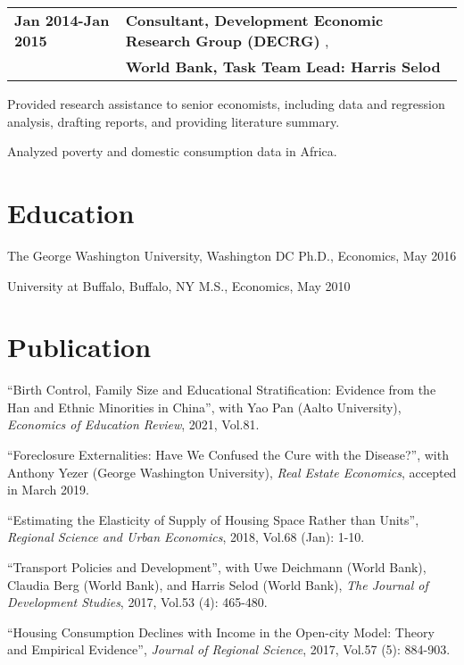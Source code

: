 \documentclass[letterpaper]{article}
\renewenvironment{itemize}{
  \begin{list}{}{
    \setlength{\leftmargin}{1.5em}
  }
}{
  \end{list}
}
\begin{document}
\begin{tabular}{ll}   

 {\bfseries Jan 2014-Jan 2015} & {\bfseries Consultant, Development Economic Research Group (DECRG)} , \\
                   & {\bfseries World Bank, Task Team Lead: Harris Selod} \\                      
 \end{tabular}  
\begin{itemize}
  \item[$-$] {\normalsize Provided research assistance to senior economists, including data and regression analysis, drafting reports, and providing literature summary.}
  \item[$-$] {\normalsize Analyzed poverty and domestic consumption data in Africa.}   
\end{itemize}

\newpage

\section*{Education}
\begin{itemize}
  \item The George Washington University, Washington DC
  \subitem Ph.D., Economics, May 2016
  \item University at Buffalo, Buffalo, NY
  \subitem M.S., Economics, May 2010 
\end{itemize}

\section*{Publication}
\begin{itemize}
 
  \item ``Birth Control, Family Size and Educational Stratification: Evidence from the Han and Ethnic Minorities in China'', with Yao Pan (Aalto University), {\slshape Economics of Education Review}, 2021, Vol.81.
  
 \item ``Foreclosure Externalities: Have We Confused the Cure with the Disease?'', with Anthony Yezer (George Washington University), {\slshape Real Estate Economics}, accepted in March 2019.
 
 \item ``Estimating the Elasticity of Supply of Housing Space Rather than Units'', {\slshape Regional Science and Urban Economics}, 2018, Vol.68 (Jan): 1-10.
 
 \item ``Transport Policies and Development'', with Uwe Deichmann (World Bank), Claudia Berg (World Bank), and Harris Selod (World Bank), {\slshape The Journal of Development Studies}, 2017, Vol.53 (4): 465-480.
 
 \item ``Housing Consumption Declines with Income in the Open-city Model: Theory and Empirical Evidence'', {\slshape Journal of Regional Science}, 2017, Vol.57 (5): 884-903.
 
\end{itemize}
\end{document}
